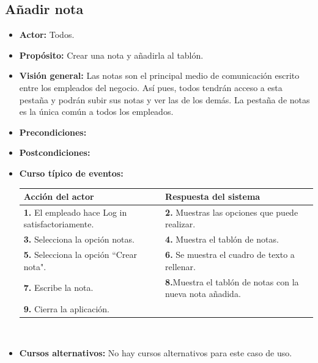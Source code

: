 \documentclass[spanish,a4paper,11pt, twoside]{report}	%
\begin{document}
	\subsection{Añadir nota} 
			\begin{itemize}
			\item \textbf{Actor:} Todos.
			\item \textbf{Propósito:} Crear una nota y añadirla al tablón.
			\item \textbf{Visión general:} Las notas son el principal medio de comunicación escrito entre los empleados del negocio. 		Así pues, todos tendrán acceso a esta pestaña y podrán subir sus notas y ver las de los demás. La pestaña de notas es la única común a todos los empleados.
			\item \textbf{Precondiciones:} 
			\item \textbf{Postcondiciones:} 
			\item \textbf{Curso típico de eventos:} 	\\
				\begin{tabular}{|p{6cm}||p{6cm}|}
				\hline
				\textbf{Acción del actor} & \textbf{Respuesta del sistema} \\ \hline \hline
				\textbf{1.}    El empleado hace Log in satisfactoriamente. & \textbf{2.} Muestras las opciones que puede realizar. \\ \hline
				\textbf{3.} Selecciona la opción notas. & \textbf{4.} Muestra el tablón de notas. \\ \hline
				\textbf{5.} Selecciona la opción “Crear nota".	& \textbf{6.} Se muestra el cuadro de texto a rellenar. \\ \hline
				\textbf{7.} Escribe la nota.	& \textbf{8.}Muestra el tablón de notas con la nueva nota añadida. \\ \hline
				\textbf{9.} Cierra la aplicación. &  \\ \hline
			\end{tabular}
			\\
			\item \textbf{Cursos alternativos:} No hay cursos alternativos para este caso de uso.
		\end {itemize}


\end{document}
